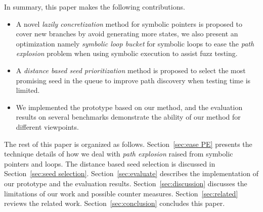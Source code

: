 In summary, this paper makes the following contributions.
\begin{itemize}
\item A novel \emph{lazily concretization} method for symbolic pointers is proposed to cover new branches by avoid generating more states, we also present an optimization namely \emph{symbolic loop bucket} for symbolic loops to ease the \emph{path explosion} problem when using symbolic execution to assist fuzz testing.

\item A \emph{distance based seed prioritization} method is proposed to select the most promising seed in the queue to improve path discovery when testing time is limited. 

\item We implemented the prototype based on our method, and the evaluation results on several benchmarks demonstrate the ability of our method for different viewpoints.
\end{itemize}

The rest of this paper is organized as follows. Section~\ref{sec:ease PE} presents the technique details of how we deal with \textit{path explosion} raised from symbolic pointers and loops. The distance based seed selection is discussed in Section~\ref{sec:seed selection}. Section~\ref{sec:evaluate} describes the implementation of our prototype and the evaluation results. Section~\ref{sec:discussion} discusses the limitations of our work and possible counter measures. Section~\ref{sec:related} reviews the related work. Section~\ref{sec:conclusion} concludes this paper.
